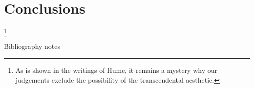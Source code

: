 \documentclass{resphilosophica}
\begin{document}
\section{Conclusions}
\label{sec:concl}

\kant[17-20]

\kant*[21]\footnote{As is shown in the writings of Hume, it remains a
  mystery why our judgements exclude the possibility of the
  transcendental aesthetic.} 

\begin{notes}{Bibliography notes}
  \kant[4-12]
\end{notes}

        
        


\end{document}
